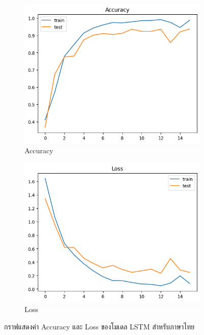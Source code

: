 \documentclass[12pt,oneside,openright,a4paper]{cpe-thai-project}
\begin{document}
      \begin{figure}[!ht]\centering
        \begin{subfigure}{0.49\textwidth}
          \includegraphics[width=\linewidth]{./img/lstm_thai_acc.png} 
          \caption{Accuracy}
          \label{fig:lstm_thai_acc}
        \end{subfigure}
        \begin{subfigure}{0.49\textwidth}
          \includegraphics[width=\linewidth]{./img/lstm_thai_loss.png}
          \caption{Loss}
          \label{fig:lstm_thai_loss}
        \end{subfigure}
        \caption{กราฟแสดงค่า Accuracy และ Loss ของโมเดล LSTM สำหรับภาษาไทย}
        \label{fig:lstm_thai}
      \end{figure}
\end{document}
